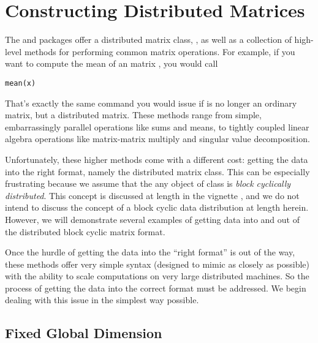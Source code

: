 

\chapter{Constructing Distributed Matrices}

The  and  packages offer a distributed matrix class, , as well as a collection of high-level methods for performing common matrix operations.  For example, if you want to compute the mean of an  matrix , you would call 
\begin{lstlisting}[language=rr]
mean(x)
\end{lstlisting}
That's exactly the same command you would issue if  is no longer an ordinary  matrix, but a distributed matrix.  These methods range from simple, embarrassingly parallel operations like sums and means, to tightly coupled linear algebra operations like matrix-matrix multiply and singular value decomposition.

Unfortunately, these higher methods come with a different cost:  getting the data into the right format, namely the distributed matrix class.  This can be especially frustrating because we assume that the any object of class  is \emph{block cyclically distributed}.  This concept is discussed at length in the  vignette \citep{Schmidt2012pbdBASEvignette}, and we do not intend to discuss the concept of a block cyclic data distribution at length herein.  However, we will demonstrate several examples of getting data into and out of the distributed block cyclic matrix format.

Once the hurdle of getting the data into the ``right format'' is out of the way, these methods offer very simple syntax (designed to mimic  as closely as possible) with the ability to scale computations on very large distributed machines.  So the process of getting the data into the correct format must be addressed.  We begin dealing with this issue in the simplest way possible.  




\section{Fixed Global Dimension}



